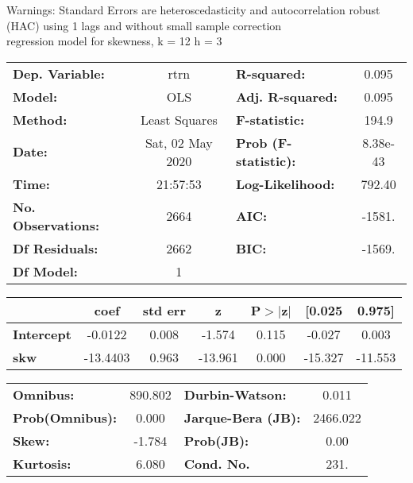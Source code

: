 Warnings: \newline
 [1] Standard Errors are heteroscedasticity and autocorrelation robust (HAC) using 1 lags and without small sample correction\\ 

regression model for skewness, k = 12 h = 3\begin{center}
\begin{tabular}{lclc}
\toprule
\textbf{Dep. Variable:}    &       rtrn       & \textbf{  R-squared:         } &     0.095   \\
\textbf{Model:}            &       OLS        & \textbf{  Adj. R-squared:    } &     0.095   \\
\textbf{Method:}           &  Least Squares   & \textbf{  F-statistic:       } &     194.9   \\
\textbf{Date:}             & Sat, 02 May 2020 & \textbf{  Prob (F-statistic):} &  8.38e-43   \\
\textbf{Time:}             &     21:57:53     & \textbf{  Log-Likelihood:    } &    792.40   \\
\textbf{No. Observations:} &        2664      & \textbf{  AIC:               } &    -1581.   \\
\textbf{Df Residuals:}     &        2662      & \textbf{  BIC:               } &    -1569.   \\
\textbf{Df Model:}         &           1      & \textbf{                     } &             \\
\bottomrule
\end{tabular}
\begin{tabular}{lcccccc}
                   & \textbf{coef} & \textbf{std err} & \textbf{z} & \textbf{P$> |$z$|$} & \textbf{[0.025} & \textbf{0.975]}  \\
\midrule
\textbf{Intercept} &      -0.0122  &        0.008     &    -1.574  &         0.115        &       -0.027    &        0.003     \\
\textbf{skw}       &     -13.4403  &        0.963     &   -13.961  &         0.000        &      -15.327    &      -11.553     \\
\bottomrule
\end{tabular}
\begin{tabular}{lclc}
\textbf{Omnibus:}       & 890.802 & \textbf{  Durbin-Watson:     } &    0.011  \\
\textbf{Prob(Omnibus):} &   0.000 & \textbf{  Jarque-Bera (JB):  } & 2466.022  \\
\textbf{Skew:}          &  -1.784 & \textbf{  Prob(JB):          } &     0.00  \\
\textbf{Kurtosis:}      &   6.080 & \textbf{  Cond. No.          } &     231.  \\
\bottomrule
\end{tabular}
\end{center}

